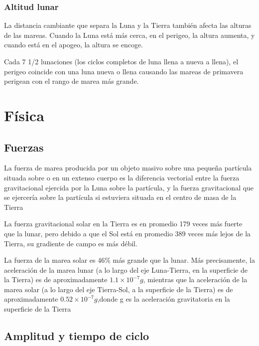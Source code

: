 \documentclass[12pt]{article}
\begin{document}
\subsubsection*{Altitud lunar}

La distancia cambiante que separa la Luna y la Tierra también afecta las alturas de las mareas. 
Cuando la Luna está más cerca, en el perigeo, la altura aumenta, y cuando está en el apogeo, la altura se encoge.

Cada 7 1/2 lunaciones (los ciclos completos de luna llena a nueva a llena), el perigeo coincide con una luna nueva o llena causando las mareas de primavera perigean con el rango de marea más grande.



\section*{Física}
\subsection*{Fuerzas}

La fuerza de marea producida por un objeto masivo 
sobre una pequeña partícula situada sobre o en un extenso cuerpo 
es la diferencia vectorial entre la fuerza gravitacional ejercida por la Luna sobre la partícula, y la fuerza gravitacional que se ejercería sobre la partícula si estuviera situada en el centro de masa de la Tierra


La fuerza gravitacional solar en la Tierra es en promedio 179 veces más fuerte que la lunar, pero debido a que el Sol está en promedio 389 veces más lejos de la Tierra, su gradiente de campo es más débil.


La fuerza de la marea solar es 46\% más grande que la lunar. Más precisamente,
la aceleración de la marea lunar (a lo largo del eje Luna-Tierra, en la superficie de la Tierra) es de aproximadamente $1{.}1\times 10^{-7} g$, mientras que la aceleración de la marea solar (a lo largo del eje Tierra-Sol, a la superficie de la Tierra) es de aproximadamente $0{.}52\times10^{-7} g$,donde g es la aceleración gravitatoria en la superficie de la Tierra


\subsection*{Amplitud y tiempo de ciclo}
\end{document}
